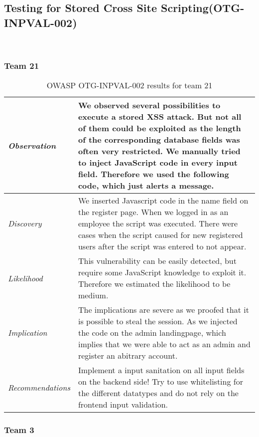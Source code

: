 \documentclass[headsepline,footsepline,footinclude=false,oneside,fontsize=11pt,paper=a4,listof=totoc,bibliography=totoc]{scrbook} %
\begin{document}
\pagebreak
\subsection{Testing for Stored Cross Site Scripting(OTG-INPVAL-002)}\

\subsubsection{Team 21}

\begin{table}[H]
	\centering
	\begin{tabular}{l p{11cm}}
		\textit{Observation} & We observed several possibilities to execute a stored XSS attack. But not all of
		them could be exploited as the length of the corresponding database fields was
		often very restricted.
		We manually tried to inject JavaScript code in every input field. Therefore we
		used the following code, which just alerts a message. \\
		\hline
		\textit{Discovery} &   We inserted Javascript code in the name field on the register page.
		When we logged in as an employee the script was executed.  There were cases when the script caused for new registered users after the script was entered to not appear. \\
		\hline
		\textit{Likelihood} & This vulnerability can be easily detected, but require some JavaScript knowledge to exploit it. Therefore we estimated the likelihood to be medium.\\
		\hline
		\textit{Implication} & The implications are severe as we proofed that it is possible to steal the session. As we injected the code on the admin landingpage, which implies that we were able to act as an admin and register an abitrary account.\\
		\hline
		\textit{Recommendations} &Implement a input sanitation on all input fields on the backend side!  Try to use whitelisting for the different datatypes and do not rely on the frontend input
		validation.\\
	\end{tabular}
	\caption{OWASP OTG-INPVAL-002 results for team 21}
	\label{table:scenario2}
\end{table}

\subsubsection{Team 3}
\end{document}
